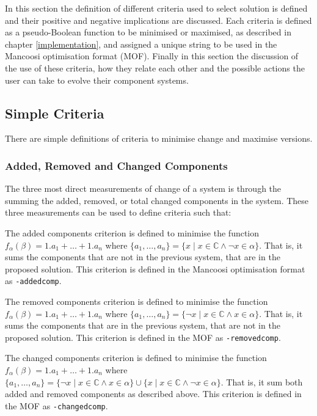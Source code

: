 In this section the definition of different criteria used to select solution is defined and their positive and negative implications are discussed.
Each criteria is defined as a pseudo-Boolean function to be minimised or maximised, as described in chapter \ref{implementation},
and assigned a unique string to be used in the Mancoosi optimisation format (MOF).
Finally in this section the discussion of the use of these criteria, how they relate each other and the possible actions the user can take to evolve their component systems.  

\subsection{Simple Criteria}
There are simple definitions of criteria to minimise change and maximise versions.

\subsubsection{Added, Removed and Changed Components}
The three most direct measurements of change of a system is through the summing the added, removed, or total changed components in the system.
These three measurements can be used to define criteria such that:
\begin{defs}
	The added components criterion is defined to minimise the function $f_{\alpha}(\beta) = 1.a_1 + \ldots + 1.a_n$
	where $\{a_1,\ldots,a_n\} = \{x \mid x \in \mathbb{C} \wedge \neg x \in \alpha\}$.
	That is, it sums the components that are not in the previous system, that are in the proposed solution.
	This criterion is defined in the Mancoosi optimisation format as \verb+-addedcomp+.
\end{defs}

\begin{defs}
	The removed components criterion is defined to minimise the function $f_{\alpha}(\beta) = 1.a_1 + \ldots + 1.a_n$
	where $\{a_1,\ldots,a_n\} = \{\neg x \mid x \in \mathbb{C} \wedge x \in \alpha\}$.
	That is, it sums the components that are in the previous system, that are not in the proposed solution.
	This criterion is defined in the MOF as \verb+-removedcomp+.
\end{defs}

\begin{defs}
	The changed components criterion is defined to minimise the function $f_{\alpha}(\beta) = 1.a_1 + \ldots + 1.a_n$
	where $\{a_1,\ldots,a_n\} = \{\neg x \mid x \in \mathbb{C} \wedge x \in \alpha \} \cup \{x \mid x \in \mathbb{C} \wedge \neg x \in \alpha \}$.
	That is, it sum both added and removed components as described above.
	This criterion is defined in the MOF as \verb+-changedcomp+.
\end{defs}

